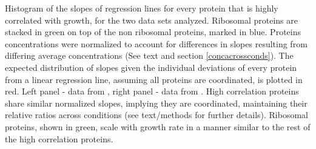 \label{fig:globalfit}
    Histogram of the slopes of regression lines for every protein that is highly correlated with growth, for the two data sets analyzed.
    Ribosomal proteins are stacked in green on top of the non ribosomal proteins, marked in blue.
    Proteins concentrations were normalized to account for differences in slopes resulting from differing average concentrations (See text and section \ref{concacrossconds}).
    The expected distribution of slopes given the individual deviations of every protein from a linear regression line, assuming all proteins are coordinated, is plotted in red.
    Left panel - data from \cite{Heinemann2015}, right panel - data from \cite{Valgepea2013}.
    High correlation proteins share similar normalized slopes, implying they are coordinated, maintaining their relative ratios across conditions (see text/methods for further details).
    Ribosomal proteins, shown in green, scale with growth rate in a manner similar to the rest of the high correlation proteins.
